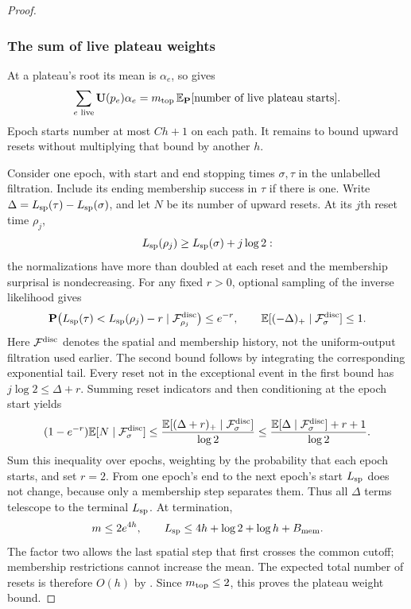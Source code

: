 \begin{proof}
\subsubsection*{The sum of live plateau weights}
At a plateau's root its mean is $\alpha_e$, so
 gives
\[
 \sum_{e\text{ live}}\mathbf U(p_e)\alpha_e
       =m_{\rm top}\,
          \mathbb E_{\mathbf P}[\text{number of live plateau starts}].
\]
Epoch starts number at most $Ch+1$ on each path.  It remains to
bound upward resets without multiplying that bound by another $h$.

Consider one epoch, with start and end stopping times $\sigma,\tau$
in the unlabelled filtration.  Include its ending membership success
in $\tau$ if there is one.  Write
$\Delta=L_{\rm sp}(\tau)-L_{\rm sp}(\sigma)$, and let $N$ be its
number of upward resets.  At its $j$th reset time $\rho_j$,
\[
 L_{\rm sp}(\rho_j)\ge L_{\rm sp}(\sigma)+j\log2:
\]
the normalizations have more than doubled at each reset and the
membership surprisal is nondecreasing.  For any fixed $r>0$,
optional sampling of the inverse likelihood gives
\[
 \mathbf P\bigl(L_{\rm sp}(\tau)<L_{\rm sp}(\rho_j)-r
                 \mid\mathcal F_{\rho_j}^{\rm disc}\bigr)\le e^{-r},
 \qquad
 \mathbb E[(-\Delta)_+\mid\mathcal F_\sigma^{\rm disc}]\le1.
\]
Here $\mathcal F^{\rm disc}$ denotes the spatial and membership
history, not the uniform-output filtration used earlier.  The
second bound follows by integrating the corresponding exponential
tail.  Every reset not in the exceptional event in the first bound
has $j\log2\le\Delta+r$.  Summing reset indicators and then
conditioning at the epoch start yields
\[
 (1-e^{-r})\mathbb E[N\mid\mathcal F_\sigma^{\rm disc}]
 \le\frac{\mathbb E[(\Delta+r)_+
                       \mid\mathcal F_\sigma^{\rm disc}]}{\log2}
 \le\frac{\mathbb E[\Delta\mid\mathcal F_\sigma^{\rm disc}]+r+1}
              {\log2}.
\]
Sum this inequality over epochs, weighting by the probability that
each epoch starts, and set $r=2$.  From one epoch's end to the next
epoch's start $L_{\rm sp}$ does not change, because only a membership
step separates them.  Thus all $\Delta$ terms telescope to the
terminal $L_{\rm sp}$.  At termination,
\[
 m\le2e^{4h},\qquad
 L_{\rm sp}\le4h+\log2+\log h+B_{\rm mem}.
\]
The factor two allows the last spatial step that first crosses the
common cutoff; membership restrictions cannot increase the mean.
The expected total number of resets is therefore $O(h)$ by
.  Since $m_{\rm top}\le2$, this proves the
plateau weight bound.


\end{proof}
